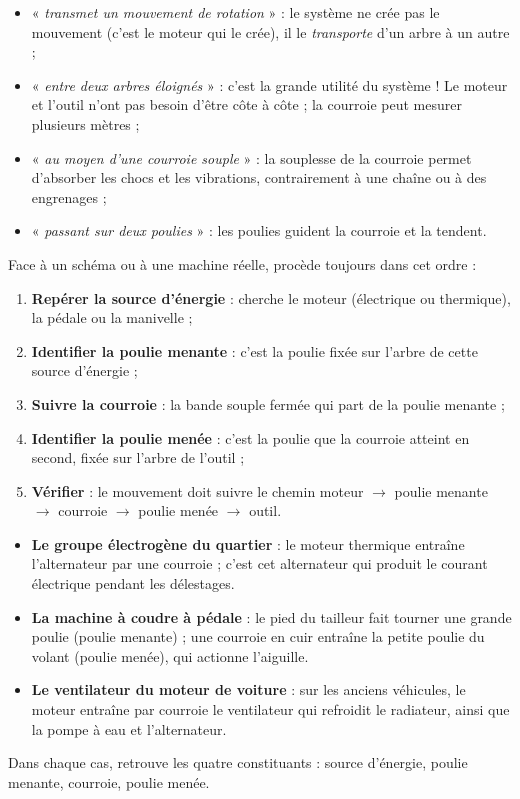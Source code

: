 \documentclass[11pt]{article}
\begin{document}
\begin{itemize}
\item « \emph{transmet un mouvement de rotation} » : le système ne crée pas le mouvement (c'est le moteur qui le crée), il le \emph{transporte} d'un arbre à un autre ;
\item « \emph{entre deux arbres éloignés} » : c'est la grande utilité du système ! Le moteur et l'outil n'ont pas besoin d'être côte à côte ; la courroie peut mesurer plusieurs mètres ;
\item « \emph{au moyen d'une courroie souple} » : la souplesse de la courroie permet d'absorber les chocs et les vibrations, contrairement à une chaîne ou à des engrenages ;
\item « \emph{passant sur deux poulies} » : les poulies guident la courroie et la tendent.
\end{itemize}

\begin{methode}
Face à un schéma ou à une machine réelle, procède toujours dans cet ordre :
\begin{enumerate}
\item \textbf{Repérer la source d'énergie} : cherche le moteur (électrique ou thermique), la pédale ou la manivelle ;
\item \textbf{Identifier la poulie menante} : c'est la poulie fixée sur l'arbre de cette source d'énergie ;
\item \textbf{Suivre la courroie} : la bande souple fermée qui part de la poulie menante ;
\item \textbf{Identifier la poulie menée} : c'est la poulie que la courroie atteint en second, fixée sur l'arbre de l'outil ;
\item \textbf{Vérifier} : le mouvement doit suivre le chemin moteur $\rightarrow$ poulie menante $\rightarrow$ courroie $\rightarrow$ poulie menée $\rightarrow$ outil.
\end{enumerate}
\end{methode}

\begin{exemplebox}
\begin{itemize}
\item \textbf{Le groupe électrogène du quartier} : le moteur thermique entraîne l'alternateur par une courroie ; c'est cet alternateur qui produit le courant électrique pendant les délestages.
\item \textbf{La machine à coudre à pédale} : le pied du tailleur fait tourner une grande poulie (poulie menante) ; une courroie en cuir entraîne la petite poulie du volant (poulie menée), qui actionne l'aiguille.
\item \textbf{Le ventilateur du moteur de voiture} : sur les anciens véhicules, le moteur entraîne par courroie le ventilateur qui refroidit le radiateur, ainsi que la pompe à eau et l'alternateur.
\end{itemize}
Dans chaque cas, retrouve les quatre constituants : source d'énergie, poulie menante, courroie, poulie menée.
\end{exemplebox}
\end{document}
